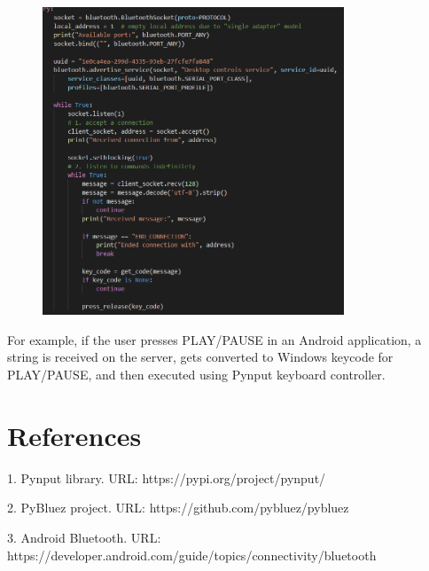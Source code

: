 \documentclass{article}
\begin{document}
\begin{figure}[ht]
\centering
\includegraphics[width=90mm]{./socket.png}
\end{figure}

For example, if the user presses PLAY/PAUSE in an Android application, a string is received on the
server, gets converted to Windows keycode for PLAY/PAUSE, and then executed using Pynput keyboard
controller.


\section{References}

1. Pynput library. URL: https://pypi.org/project/pynput/

2. PyBluez project. URL: https://github.com/pybluez/pybluez

3. Android Bluetooth. URL: https://developer.android.com/guide/topics/connectivity/bluetooth
\end{document}
